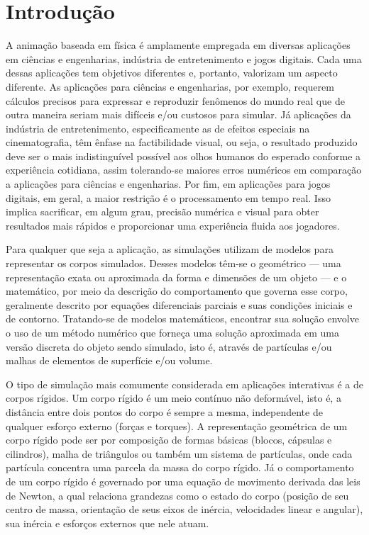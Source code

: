 \documentclass[12pt,a4paper,dvipsnames]{article}
\begin{document}
\section{Introdução}
\label{sec:introduction}

A animação baseada em física é amplamente empregada em diversas aplicações em ciências e engenharias, indústria de entretenimento e jogos digitais. Cada uma dessas aplicações tem objetivos diferentes e, portanto, valorizam um aspecto diferente. As aplicações para ciências e engenharias, por exemplo, requerem cálculos precisos para expressar e reproduzir fenômenos do mundo real que de outra maneira seriam mais difíceis e/ou custosos para simular. Já aplicações da indústria de entretenimento, especificamente as de efeitos especiais na cinematografia, têm ênfase na factibilidade visual, ou seja, o resultado produzido deve ser o mais indistinguível possível aos olhos humanos do esperado conforme a experiência cotidiana, assim tolerando-se maiores erros numéricos em comparação a aplicações para ciências e engenharias. Por fim, em aplicações para jogos digitais, em geral, a maior restrição é o processamento em tempo real. Isso implica sacrificar, em algum grau, precisão numérica e visual para obter resultados mais rápidos e proporcionar uma experiência fluida aos jogadores.

Para qualquer que seja a aplicação, as simulações utilizam de modelos para representar os corpos simulados. Desses modelos têm-se o geométrico --- uma representação exata ou aproximada da forma e dimensões de um objeto --- e o matemático, por meio da descrição do comportamento que governa esse corpo, geralmente descrito por equações diferenciais parciais e suas condições iniciais e de contorno. Tratando-se de modelos matemáticos, encontrar sua solução envolve o uso de um método numérico que forneça uma solução aproximada em uma versão discreta do objeto sendo simulado, isto é, através de partículas e/ou malhas de elementos de superfície e/ou volume.

O tipo de simulação mais comumente considerada em aplicações interativas é a de corpos rígidos. Um corpo rígido é um meio contínuo não deformável, isto é, a distância entre dois pontos do corpo é sempre a mesma, independente de qualquer esforço externo (forças e torques). A representação geométrica de um corpo rígido pode ser por composição de formas básicas (blocos, cápsulas e cilindros), malha de triângulos ou também um sistema de partículas, onde cada partícula concentra uma parcela da massa do corpo rígido. Já o comportamento de um corpo rígido é governado por uma equação de movimento derivada das leis de Newton, a qual relaciona grandezas como o estado do corpo (posição de seu centro de massa, orientação de seus eixos de inércia, velocidades linear e angular), sua inércia e esforços externos que nele atuam.
\end{document}
